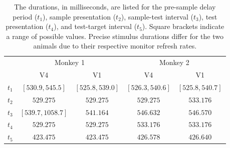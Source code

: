 \begin{table}[bthp]
{%
%
\begin{tabular}{lcccc}
\toprule
                            & \multicolumn{2}{c}{Monkey 1}          & \multicolumn{2}{c}{Monkey 2}          \\
                            \cmidrule(r){2-3}                       \cmidrule(l){4-5}
                            & \acs{V4}          & \acs{V1}          & \acs{V4}          & \acs{V1}          \\
\midrule
$t_1$                       & $[530.9, 545.5]$  & $[525.8, 539.0]$  & $[526.3, 540.6]$  & $[525.8, 540.7]$  \\
$t_2$                       & $529.275$         & $529.275$         & $529.275$         & $533.176$         \\
$t_3$                       & $[539.7, 1058.7]$ & $541.164$         & $546.632$         & $546.570$         \\
$t_4$                       & $529.275$         & $529.275$         & $533.176$         & $533.176$         \\
$t_5$                       & $423.475$         & $423.475$         & $426.578$         & $426.640$         \\
\bottomrule
%
\end{tabular}
} %
\caption{
The durations, in milliseconds, are listed for the
pre-sample delay period ($t_1$),
sample presentation ($t_2$),
sample-test interval ($t_3$),
test presentation ($t_4$), and
test-target interval ($t_5$).
Square brackets indicate a range of possible values.
Precise stimulus durations differ for the two animals due to their respective monitor refresh rates.
}
\label{tab:tptimes}
\end{table}


